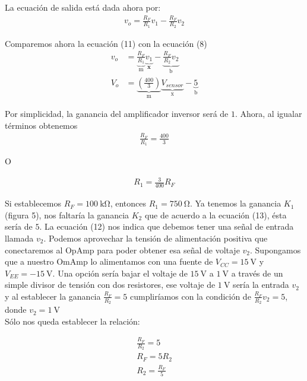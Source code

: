 \documentclass{article}
\begin{document}
La ecuación de salida está dada ahora por:
\begin{align}
	v_o = \frac{R_F}{R_1}v_1 - \frac{R_F}{R_2}v_2
\end{align}

\noindent Comparemos ahora la ecuación (11) con la ecuación (8)
\begin{align}
	v_o &= \underbrace{\frac{R_F}{R_1}}_\text{m}\underbrace{v_1}_\textbf{x} - \underbrace{\frac{R_F}{R_2}v_2}_\text{b} \\
	V_{o} &=  \underbrace{\left( \frac{400}{3} \right)}_\text{m}\underbrace{V_{sensor}}_\text{x}  - \underbrace{5}_\text{b}
\end{align}

\noindent Por simplicidad, la ganancia del amplificador inversor será de $1$. Ahora, al igualar términos obtenemos
\begin{align}
	\frac{R_F}{R_1} =\frac{400}{3} \nonumber
\end{align}

\noindent O

\begin{align}
	R_1 = \frac{3}{400}R_F \nonumber
\end{align}

\noindent Si establecemos $R_F = \qty{100}{\kilo \ohm}$, entonces $R_1 = \qty{750}{\ohm}$. Ya tenemos la ganancia $K_1$ (figura 5), nos faltaría la ganancia $K_2$ que de acuerdo a la ecuación (13), ésta sería de $5$. La ecuación (12) nos indica que debemos tener una señal de entrada llamada $v_2$. Podemos aprovechar la tensión de alimentación positiva que conectaremos al OpAmp para poder obtener esa señal de voltaje $v_2$. Supongamos que a nuestro OmAmp lo alimentamos con una fuente de $V_{{CC}} = \qty{15}{\volt}$ y $V_{{EE}} = \qty{-15}{\volt}$. Una opción sería bajar el voltaje de $\qty{15}{\volt}$ a $\qty{1}{\volt}$ a través de un simple divisor de tensión con dos resistores, ese voltaje de $\qty{1}{\volt}$ sería la entrada $v_2$ y al establecer la ganancia $\frac{R_F}{R_2} = 5$ cumpliríamos con la condición de $\frac{R_F}{R_2}v_2 = 5$, donde $v_2 = \qty{1}{\volt}$\\

\noindent Sólo nos queda establecer la relación:

\begin{align}
	\frac{R_F}{R_2} = 5\nonumber \\
	R_F = 5R_2 \nonumber \\
	R_2 = \frac{R_F}{5} \nonumber
\end{align}
\end{document}

